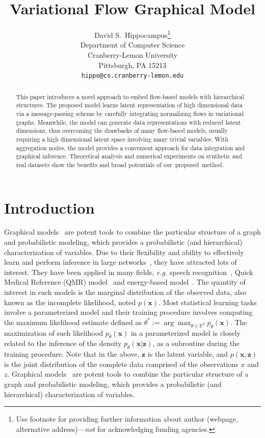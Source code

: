 \documentclass{article}
\title{Variational Flow Graphical Model}
\author{%
  David S.~Hippocampus\thanks{Use footnote for providing further information
    about author (webpage, alternative address)---\emph{not} for acknowledging
    funding agencies.} \\
  Department of Computer Science\\
  Cranberry-Lemon University\\
  Pittsburgh, PA 15213 \\
  \texttt{hippo@cs.cranberry-lemon.edu} \\
}
\newcommand{\RN}[1]{%
	\textup{\lowercase\expandafter{\it \romannumeral#1}}%
}
\begin{document}
\maketitle

\begin{abstract}
This paper introduces a novel approach to  embed flow-based models with hierarchical structures. The proposed model learns latent representation of high dimensional data via a message-passing scheme by carefully integrating normalizing flows in variational graphs. Meanwhile, the model can generate data representations with reduced latent dimensions, thus overcoming the drawbacks of many flow-based models, usually requiring a high dimensional latent space involving many trivial variables. With aggregation nodes, the model provides a convenient approach for data integration and graphical inference.  Theoretical analysis and numerical experiments on synthetic and real datasets show the benefits and broad potentials of our~proposed~method.
\end{abstract}

\vspace{-0.2in}
\section{Introduction}
Graphical models~\cite{madigan1995bayesian,hruschka2007bayesian} are potent tools to combine the particular structure of a graph and probabilistic modeling, which provides a probabilistic (and hierarchical) characterization of variables. 
Due to their flexibility and ability to effectively learn and perform inference in large networks~\cite{koller2007graphical}, they have attracted lots of interest. They have been applied in many fields, \textit{e.g.} speech recognition~\cite{bilmes2005graphical}, Quick Medical Reference (QMR) model~\cite{shwe1990probabilistic} and energy-based model~\cite{jordan1999graphical}.
The quantity of interest in such models is the marginal distribution of the observed data, also known as the incomplete likelihood, noted $p(\mathbf{x})$.
Most statistical learning tasks involve a parameterized model and their training procedure involves computing the maximum likelihood estimate defined as $\theta^* :=  \arg \max_{\theta \in \mathbb{R}^d} p_{\theta}(\mathbf{x})$.
The maximization of such likelihood $p_{\theta}(\mathbf{x})$ in a parameterized model is closely related to the inference of the density $p_{\theta}(\mathbf{x}|\mathbf{z})$, as a subroutine during the training procedure.
 Note that in the above, $\mathbf{z}$ is the latent variable, and $p(\mathbf{x}, \mathbf{z})$ is the joint distribution of the complete data comprised of the observations $x$ and $z$. Graphical models~\cite{madigan1995bayesian,hruschka2007bayesian} are potent tools to combine the particular structure of a graph and probabilistic modeling, which provides a probabilistic (and hierarchical) characterization of variables. 
\end{document}

